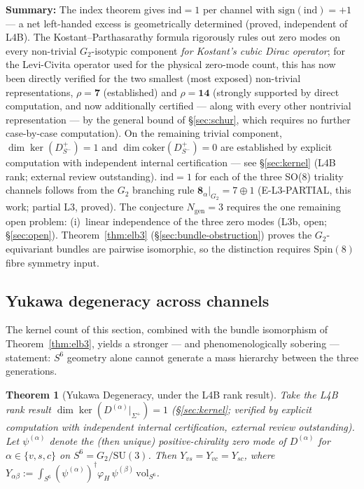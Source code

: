 \documentclass[12pt,a4paper]{article}
\newcommand{\ind}{\mathrm{ind}}
\newtheorem{theorem}[lemma]{Theorem}
\begin{document}
\textbf{Summary:} The index theorem gives $\ind=1$ per channel with
$\mathrm{sign}(\ind)=+1$ --- a net left-handed excess is geometrically determined (proved,
independent of L4B). The Kostant--Parthasarathy formula rigorously rules out zero modes on
every non-trivial $G_2$-isotypic component \emph{for Kostant's cubic Dirac operator}; for the
Levi-Civita operator used for the physical zero-mode count, this has now been directly verified
for the two smallest (most exposed) non-trivial representations, $\rho=\mathbf{7}$ (established)
and $\rho=\mathbf{14}$ (strongly supported by direct computation, and now additionally
certified --- along with every other nontrivial representation --- by the general bound
of \S\ref{sec:schur}, which requires no further case-by-case computation).
On the remaining trivial component, $\dim\ker(D^+_{S^-})=1$ and
$\dim\mathrm{coker}(D^+_{S^-})=0$ are established by explicit computation with
independent internal certification --- see \S\ref{sec:kernel} (L4B rank; external review
outstanding). $\ind=1$ for each of the three SO(8)
triality channels follows from the $G_2$ branching rule $\mathbf{8}_\alpha|_{G_2}=7\oplus 1$
(E-L3-PARTIAL, this work; partial L3, proved).
The conjecture $N_{\mathrm{gen}}=3$ requires the one remaining open problem:
(i)~linear independence of the three zero modes (L3b, open; \S\ref{sec:open}).
Theorem~\ref{thm:elb3} (\S\ref{sec:bundle-obstruction}) proves the $G_2$-equivariant
bundles are pairwise isomorphic, so the distinction requires $\mathrm{Spin}(8)$ fibre
symmetry input.

\subsection{Yukawa degeneracy across channels}
\label{sec:yukawa-deg}

The kernel count of this section, combined with the bundle isomorphism of
Theorem~\ref{thm:elb3}, yields a stronger --- and phenomenologically sobering ---
statement: $S^6$ geometry alone cannot generate a mass hierarchy between the three
generations.

\begin{theorem}[Yukawa Degeneracy, under the L4B rank result]\label{thm:yukawa-deg}
  Take the L4B rank result $\dim\ker(D^{(\alpha)}|_{\Sigma^+})=1$
  (\S\ref{sec:kernel}; verified by explicit computation with independent internal
  certification, external review outstanding). Let $\psi^{(\alpha)}$ denote the (then unique)
  positive-chirality zero mode of $D^{(\alpha)}$
  for $\alpha\in\{v,s,c\}$ on $S^6 = G_2/\mathrm{SU}(3)$. Then
  $Y_{vs} = Y_{vc} = Y_{sc}$,
  where $Y_{\alpha\beta} := \int_{S^6} (\psi^{(\alpha)})^\dagger \varphi_H\, \psi^{(\beta)}\,\mathrm{vol}_{S^6}$.
\end{theorem}
\end{document}
